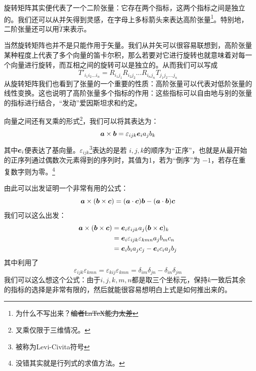 \documentclass[12pt,a4paper,openany,twoside]{book}
\numberwithin{equation}{section}
\begin{document}
        旋转矩阵其实便代表了一个二阶张量：它存在两个指标，这两个指标之间是独立的。我们还可以从并矢得到灵感，在字母上多标箭头来表达高阶张量\footnote{为什么不写出来？\sout{编者\LaTeX 能力太差}}。特别地，二阶张量还可以用$\overleftrightarrow{T}$来表示。

        当然旋转矩阵也并不是只能作用于矢量。我们从并矢可以很容易联想到，高阶张量某种程度上代表了多个向量的笛卡尔积，那么若要对它进行旋转也就意味着对每一个向量进行旋转，而互相之间的旋转可以是独立的。从而我们可以写成
        \begin{equation*}
          T'_{i_1i_2...i_n} = R_{i_1j_1} R_{i_2j_2} ... R_{i_n j_n} T_{j_1j_2....j_n}
        \end{equation*} 
        从旋转矩阵我们也看到了张量的一个重要的性质：高阶张量可以代表对低阶张量的线性变换。这也说明了高阶张量多个指标的作用：这些指标可以自由地与别的张量的指标进行结合，“发动”爱因斯坦求和约定。

        向量之间还有叉乘的形式\footnote{叉乘仅限于三维情况。}，我们可以将其表达为：
        \begin{equation*}
          \vb*{a} \times \vb*{b} = \varepsilon_{ijk} \vb*{e}_i a_j b_k
        \end{equation*} 
        其中$\vb*{e}_i$便表达了基向量。$\varepsilon_{ijk}$\footnote{被称为Levi-Civita符号}表达的是若 $i,j,k$的顺序为“正序”，也就是从最开始的正序列通过偶数次元素得到的序列时，其值为1，若为“倒序”为 $-1$，若存在重复数字则为零。\footnote{没错其实就是行列式的求值方法。}

        由此可以出发证明一个非常有用的公式：
        \begin{equation}
          \vb*{a}\times (\vb*{b}\times \vb*{c}) = (\vb*{a} \cdot \vb*{c}) \vb*{b} - (\vb*{a} \cdot \vb*{b}) \vb*{c}
        \end{equation} 
        我们可以这么出发：
        \begin{align*}
          \vb*{a} \times (\vb*{b} \times \vb*{c}) &= \vb*{e}_i \varepsilon_{ijk} a_j (\vb*{b} \times \vb*{c})_k \\
          &= \vb*{e}_i \varepsilon_{ijk} \varepsilon_{kmn} a_j b_m c_n \\
          &= \vb*{e}_i b_i a_j c_j - \vb*{e}_i c_i a_j b_j
        \end{align*}
        其中利用了
        \begin{equation}
          \varepsilon_{ijk}\varepsilon_{kmn} = \varepsilon_{kij} \varepsilon_{kmn} = \delta_{im} \delta_{jn} - \delta_{in}\delta_{jm}
        \end{equation} 
        我们可以这么想这个公式：由于$i,j,k,m,n$都是取三个坐标元，保持$k$一致后其余的指标的选择是非常有限的，然后就能很容易想明白上式是如何推出来的。
\end{document}

